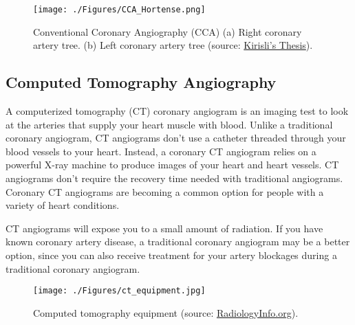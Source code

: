 \begin{figure}[htbp]
	\centering
		\texttt{[image: ./Figures/CCA\_Hortense.png]}
	\caption[Conventional Coronary Angiography]{Conventional Coronary Angiography (CCA) (a) Right coronary artery tree. (b) Left coronary artery tree  (source: \href{http://www.bigr.nl/publication/880}{Kirisli's Thesis}).}
	\label{fig:cca_im}
\end{figure}

\subsection{Computed Tomography Angiography }

A computerized tomography (CT) coronary angiogram is an imaging test to look at the arteries that supply your heart muscle with blood. Unlike a traditional coronary angiogram, CT angiograms don't use a catheter threaded through your blood vessels to your heart. Instead, a coronary CT angiogram relies on a powerful X-ray machine to produce images of your heart and heart vessels. CT angiograms don't require the recovery time needed with traditional angiograms. Coronary CT angiograms are becoming a common option for people with a variety of heart conditions.

CT angiograms will expose you to a small amount of radiation. If you have known coronary artery disease, a traditional coronary angiogram may be a better option, since you can also receive treatment for your artery blockages during a traditional coronary angiogram.


\begin{figure}[htbp]
	\centering
		\texttt{[image: ./Figures/ct\_equipment.jpg]}
	\caption[Computed tomography equipment]{Computed tomography equipment (source: \href{http://www.radiologyinfo.org/}{RadiologyInfo.org}).}
	\label{fig:ct_eq}
\end{figure}

